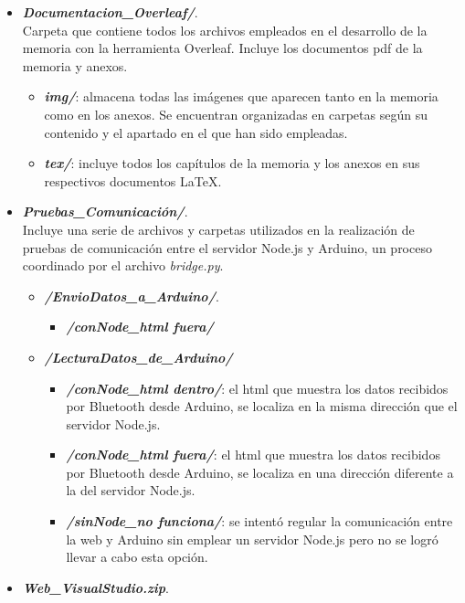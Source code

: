 \begin{itemize}
\begin{itemize}
    \end{itemize}
    \item \textbf{\textit{Documentacion\_Overleaf/}}.\\
    Carpeta que contiene todos los archivos empleados en el desarrollo de la memoria con la herramienta Overleaf. Incluye los documentos pdf de la memoria y anexos.
    \begin{itemize}
        \item \textbf{\textit{img/}}: almacena todas las imágenes que aparecen tanto en la memoria como en los anexos. Se encuentran organizadas en carpetas según su contenido y el apartado en el que han sido empleadas.
        \item \textbf{\textit{tex/}}: incluye todos los capítulos de la memoria y los anexos en sus respectivos documentos LaTeX.
    \end{itemize}
    \item \textbf{\textit{Pruebas\_Comunicación/}}.\\
    Incluye una serie de archivos y carpetas utilizados en la realización de pruebas de comunicación entre el servidor Node.js y Arduino, un proceso coordinado por el archivo \textit{bridge.py}.
    \begin{itemize}
        \item \textbf{\textit{/EnvioDatos\_a\_Arduino/}}.
        \begin{itemize}
            \item \textbf{\textit{/conNode\_html fuera/}}
        \end{itemize}
        \item \textbf{\textit{/LecturaDatos\_de\_Arduino/}}
        \begin{itemize}
            \item \textbf{\textit{/conNode\_html dentro/}}: el html que muestra los datos recibidos por Bluetooth desde Arduino, se localiza en la misma dirección que el servidor Node.js.
            \item \textbf{\textit{/conNode\_html fuera/}}: el html que muestra los datos recibidos por Bluetooth desde Arduino, se localiza en una dirección diferente a la del servidor Node.js.
            \item \textbf{\textit{/sinNode\_no funciona/}}: se intentó regular la comunicación entre la web y Arduino sin emplear un servidor Node.js pero no se logró llevar a cabo esta opción.
        \end{itemize}
    \end{itemize}
    \item \textbf{\textit{Web\_VisualStudio.zip}}.\\ 

\end{itemize}
